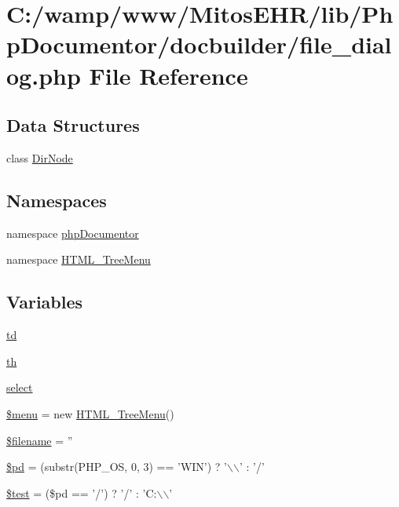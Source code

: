 \hypertarget{file__dialog_8php}{\section{\-C\-:/wamp/www/\-Mitos\-E\-H\-R/lib/\-Php\-Documentor/docbuilder/file\-\_\-dialog.php \-File \-Reference}
\label{file__dialog_8php}
}
\subsection*{\-Data \-Structures}
\begin{DoxyCompactItemize}
\item 
class \hyperlink{class_dir_node}{\-Dir\-Node}
\end{DoxyCompactItemize}
\subsection*{\-Namespaces}
\begin{DoxyCompactItemize}
\item 
namespace \hyperlink{namespacephp_documentor}{php\-Documentor}
\item 
namespace \hyperlink{namespace_h_t_m_l___tree_menu}{\-H\-T\-M\-L\-\_\-\-Tree\-Menu}
\end{DoxyCompactItemize}
\subsection*{\-Variables}
\begin{DoxyCompactItemize}
\item 
\hyperlink{file__dialog_8php_a1473726ef73758eecc3291c232d25d3c}{td}
\item 
\hyperlink{file__dialog_8php_a4c7354b9bcf8e1c1ff1c0d28b0d4276a}{th}
\item 
\hyperlink{file__dialog_8php_ae180890d7caabe9962d544350eca4638}{select}
\item 
\hyperlink{file__dialog_8php_a44b0c947ca193a7764153898f5336910}{\$menu} = new \hyperlink{class_h_t_m_l___tree_menu}{\-H\-T\-M\-L\-\_\-\-Tree\-Menu}()
\item 
\hyperlink{file__dialog_8php_a6b7de8d10c540db2f1631e68b2aa0538}{\$filename} = ''
\item 
\hyperlink{file__dialog_8php_a0504ca5eae7aa6afd25cce9724b68ec6}{\$pd} = (substr(\-P\-H\-P\-\_\-\-O\-S, 0, 3) == '\-W\-I\-N') ? '$\backslash$$\backslash$' \-: '/'
\item 
\hyperlink{file__dialog_8php_a31daebf88fc668f410293e2c70cea3fc}{\$test} = (\$pd == '/') ? '/' \-: '\-C\-:$\backslash$$\backslash$'
\end{DoxyCompactItemize}


